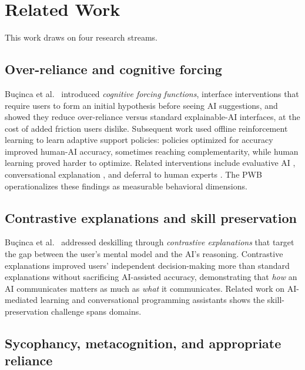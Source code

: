 \documentclass{article}
\begin{document}
\section{Related Work}
\label{sec:related}

This work draws on four research streams.

\subsection{Over-reliance and cognitive forcing}

Bu\c{c}inca et al.\ \cite{bucinca2021trust} introduced \textit{cognitive forcing functions}, interface interventions that require users to form an initial hypothesis before seeing AI suggestions, and showed they reduce over-reliance versus standard explainable-AI interfaces, at the cost of added friction users dislike. Subsequent work \cite{bucinca2024towards} used offline reinforcement learning to learn adaptive support policies: policies optimized for accuracy improved human-AI accuracy, sometimes reaching complementarity, while human learning proved harder to optimize. Related interventions include evaluative AI \cite{miller2023evaluative}, conversational explanation \cite{slack2023explaining}, and deferral to human experts \cite{keswani2022designing}. The PWB operationalizes these findings as measurable behavioral dimensions.

\subsection{Contrastive explanations and skill preservation}

Bu\c{c}inca et al.\ \cite{bucinca2024contrastive} addressed deskilling through \textit{contrastive explanations} that target the gap between the user's mental model and the AI's reasoning. Contrastive explanations improved users' independent decision-making more than standard explanations without sacrificing AI-assisted accuracy, demonstrating that \textit{how} an AI communicates matters as much as \textit{what} it communicates. Related work on AI-mediated learning \cite{gajos2022people} and conversational programming assistants \cite{ross2023programmer} shows the skill-preservation challenge spans domains.

\subsection{Sycophancy, metacognition, and appropriate reliance}
\end{document}
